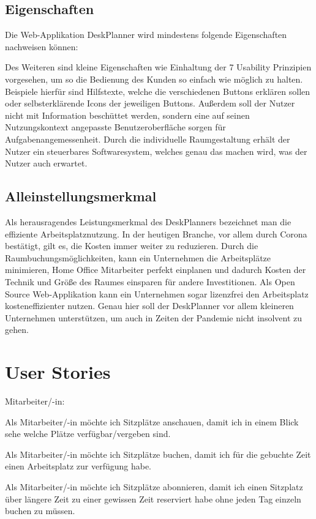 \documentclass{article}
\begin{document}
\subsection{Eigenschaften}
Die Web-Applikation DeskPlanner wird mindestens folgende Eigenschaften nachweisen können:

Des Weiteren sind kleine Eigenschaften wie Einhaltung der 7 Usability Prinzipien vorgesehen, um so die Bedienung des Kunden so einfach wie möglich zu halten. 
Beispiele hierfür sind Hilfstexte, welche die verschiedenen Buttons erklären sollen oder selbsterklärende Icons der jeweiligen Buttons. 
Außerdem soll der Nutzer nicht mit Information beschüttet werden, sondern eine auf seinen Nutzungskontext angepasste Benutzeroberfläche sorgen für Aufgabenangemessenheit. 
Durch die individuelle Raumgestaltung erhält der Nutzer ein steuerbares Softwaresystem, welches genau das machen wird, was der Nutzer auch erwartet.

\subsection{Alleinstellungsmerkmal}
Als herausragendes Leistungsmerkmal des DeskPlanners bezeichnet man die effiziente Arbeitsplatznutzung. 
In der heutigen Branche, vor allem durch Corona bestätigt, gilt es, die Kosten immer weiter zu reduzieren. 
Durch die Raumbuchungsmöglichkeiten, kann ein Unternehmen die Arbeitsplätze minimieren, Home Office Mitarbeiter perfekt einplanen und dadurch Kosten der Technik und Größe des Raumes einsparen für andere Investitionen. 
Als Open Source Web-Applikation kann ein Unternehmen sogar lizenzfrei den Arbeitsplatz kosteneffizienter nutzen.
Genau hier soll der DeskPlanner vor allem kleineren Unternehmen unterstützen, um auch in Zeiten der Pandemie nicht insolvent zu gehen.

\section{User Stories}
Mitarbeiter/-in:

Als Mitarbeiter/-in möchte ich Sitzplätze anschauen, damit ich in einem Blick sehe welche Plätze verfügbar/vergeben sind.

Als Mitarbeiter/-in möchte ich Sitzplätze buchen, damit ich für die gebuchte Zeit einen Arbeitsplatz zur verfügung habe.

Als Mitarbeiter/-in möchte ich Sitzplätze abonnieren, damit ich einen Sitzplatz über längere Zeit zu einer gewissen Zeit reserviert habe ohne jeden Tag einzeln buchen zu müssen.
\end{document}
